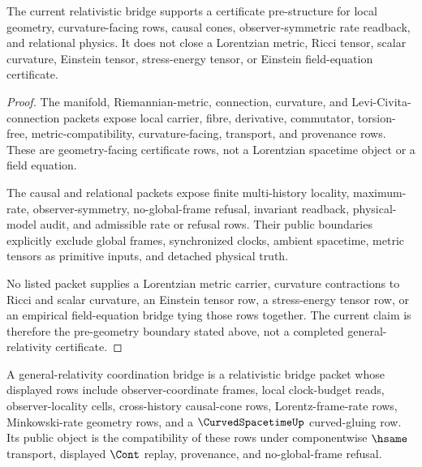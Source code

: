 \begin{theorem}
\label{thm:philosophy-relativistic-bridge-pregeometry-boundary}
The current relativistic bridge supports a certificate pre-structure for
local geometry, curvature-facing rows, causal cones, observer-symmetric rate
readback, and relational physics. It does not close a Lorentzian metric,
Ricci tensor, scalar curvature, Einstein tensor, stress-energy tensor, or
Einstein field-equation certificate.
\end{theorem}
\begin{proof}
The manifold, Riemannian-metric, connection, curvature, and
Levi-Civita-connection packets expose local carrier, fibre, derivative,
commutator, torsion-free, metric-compatibility, curvature-facing, transport,
and provenance rows. These are geometry-facing certificate rows, not a
Lorentzian spacetime object or a field equation.

The causal and relational packets expose finite multi-history locality,
maximum-rate, observer-symmetry, no-global-frame refusal, invariant readback,
physical-model audit, and admissible rate or refusal rows. Their public
boundaries explicitly exclude global frames, synchronized clocks, ambient
spacetime, metric tensors as primitive inputs, and detached physical truth.

No listed packet supplies a Lorentzian metric carrier, curvature contractions
to Ricci and scalar curvature, an Einstein tensor row, a stress-energy tensor
row, or an empirical field-equation bridge tying those rows together. The
current claim is therefore the pre-geometry boundary stated above, not a
completed general-relativity certificate.
\end{proof}

\begin{definition}
\label{def:philosophy-general-relativity-coordination-bridge}
A general-relativity coordination bridge is a relativistic bridge packet whose
displayed rows include observer-coordinate frames, local clock-budget reads,
observer-locality cells, cross-history causal-cone rows, Lorentz-frame-rate
rows, Minkowski-rate geometry rows, and a $\CurvedSpacetimeUp$ curved-gluing
row. Its public object is the compatibility of these rows under componentwise
$\hsame$ transport, displayed $\Cont$ replay, provenance, and no-global-frame
refusal.
\end{definition}

